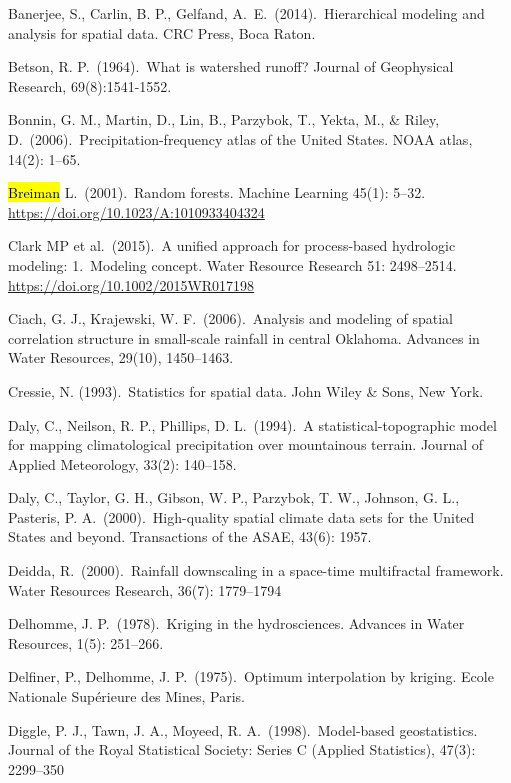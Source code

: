 \begin{thebibliography}{9}
Banerjee, S., Carlin, B. P.,  Gelfand, A.\ E.\ (2014).\ Hierarchical modeling and analysis for spatial data.
CRC Press, Boca Raton.

Betson, R. P.\ (1964).\ What is watershed runoff?
Journal of Geophysical Research, 69(8):1541-1552.

Bonnin, G. M., Martin, D., Lin, B., Parzybok, T., Yekta, M., \& Riley, D.\ (2006).\
Precipitation-frequency atlas of the United States.
NOAA atlas, 14(2): 1--65.

\hl{Breiman} L.\ (2001).\ Random forests.
Machine Learning 45(1): 5--32.
\url{https://doi.org/10.1023/A:1010933404324}

Clark MP et al.\ (2015).\ A unified approach for process-based hydrologic modeling:
1.\ Modeling concept.
Water Resource Research 51: 2498--2514. \url{https://doi.org/10.1002/2015WR017198}

Ciach, G. J.,  Krajewski, W. F.\ (2006).\ Analysis and modeling of spatial correlation structure in small-scale rainfall in central Oklahoma.
Advances in Water Resources, 29(10), 1450--1463.

Cressie, N. (1993).\ Statistics for spatial data.
John Wiley \& Sons, New York.

Daly, C., Neilson, R. P.,  Phillips, D. L.\ (1994).\ A statistical-topographic model for mapping climatological precipitation over mountainous terrain.
Journal of Applied Meteorology, 33(2): 140--158.

Daly, C., Taylor, G. H., Gibson, W. P., Parzybok, T. W., Johnson, G. L., Pasteris, P. A.\ (2000).\
High-quality spatial climate data sets for the United States and beyond.
Transactions of the ASAE, 43(6): 1957.

Deidda, R.\ (2000).\ Rainfall downscaling in a space-time multifractal framework.
Water Resources Research, 36(7): 1779--1794

Delhomme, J. P.\ (1978).\ Kriging in the hydrosciences.
Advances in Water Resources, 1(5): 251--266.

Delfiner, P., Delhomme, J. P.\ (1975).\ Optimum interpolation by kriging.
Ecole Nationale Sup{\'e}rieure des Mines, Paris.

Diggle, P. J., Tawn, J. A., Moyeed, R. A.\ (1998).\  Model-based geostatistics.
Journal of the Royal Statistical Society: Series C (Applied Statistics), 47(3): 2299--350


\end{thebibliography}
